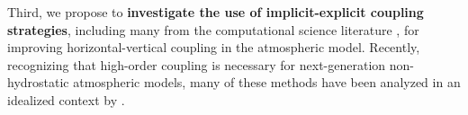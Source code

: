 \documentclass[11pt]{article}
\begin{document}
Third, we propose to \textbf{investigate the use of implicit-explicit coupling strategies}, including many from the computational science literature \cite{UASJRRJS1997AMM, CACMHK2003ANM}, for improving horizontal-vertical coupling in the atmospheric model.  Recently, recognizing that high-order coupling is necessary for next-generation non-hydrostatic atmospheric models, many of these methods have been analyzed in an idealized context by \cite{HWSJLNW2013JCP}.





\end{document}
